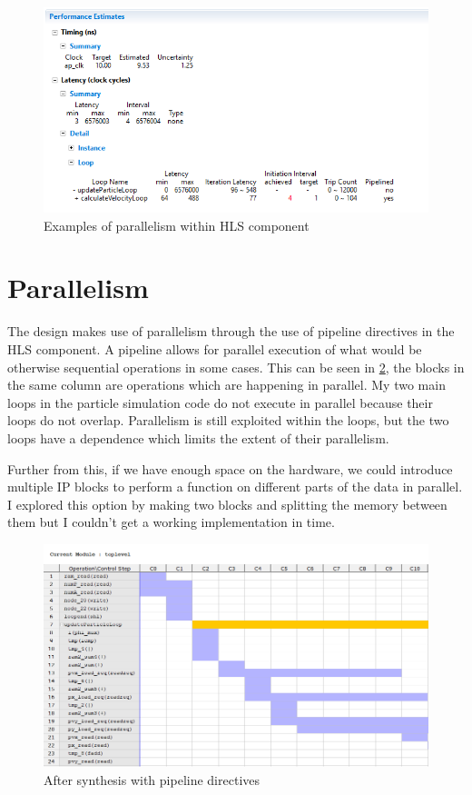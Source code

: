 \documentclass[12pt]{article} %
\begin{document}
\begin{figure}[h!]
  \centering
  \includegraphics[width=\linewidth]{figures/pipe-lining.jpg}
  \caption{Examples of parallelism within HLS component}
  \label{Figure:pipe-lining}
\end{figure}

\clearpage

\section{Parallelism}

The design makes use of parallelism through the use of pipeline directives in the HLS component. A pipeline allows for parallel execution of what would be otherwise sequential operations in some cases. This can be seen in \cref{Figure:parallel}, the blocks in the same column are operations which are happening in parallel. My two main loops in the particle simulation code do not execute in parallel because their loops do not overlap. Parallelism is still exploited within the loops, but the two loops have a dependence which limits the extent of their parallelism.

Further from this, if we have enough space on the hardware, we could introduce multiple IP blocks to perform a function on different parts of the data in parallel. I explored this option by making two blocks and splitting the memory between them but I couldn't get a working implementation in time.

\begin{figure}[h!]
  \centering
  \includegraphics[width=\linewidth]{figures/parallel.jpg}
  \caption{After synthesis with pipeline directives}
  \label{Figure:parallel}
\end{figure}
\end{document}
